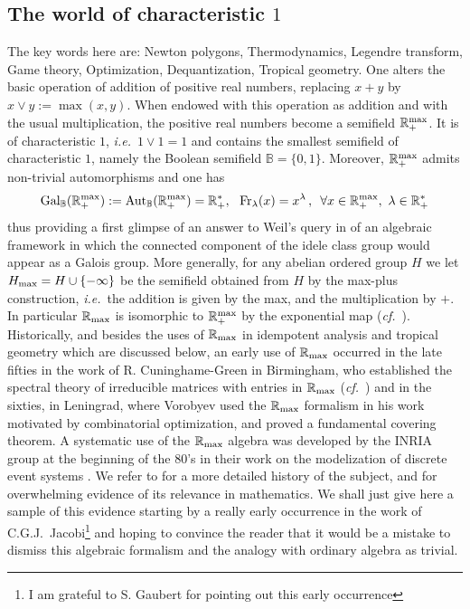 \documentclass[12pt]{article}
\def\qqq{\,,\quad~\forall}
\def\Aut{{\rm Aut}}
\def\B{{\mathbb B}}
\def\R{{\mathbb R}}
\def\qqq{\,,\,~\forall}
\newcommand{\ie}{{\it i.e.\/}\ }
\newcommand{\cf}{{\it cf.}}
\newcommand{\cff}{{\it cf.}~}
\def\rma{\R_{\rm max}}
\def\rmax{\R_+^{\rm max}}
\def\fr{{\rm Fr}}
\begin{document}
\subsection{The world of characteristic $1$}\label{sectchar1}
The key words here are: Newton polygons, Thermodynamics, Legendre transform, Game theory, Optimization, Dequantization, Tropical geometry. One alters the basic operation of addition of positive real numbers, replacing $x+y$ by  $x\vee y:=\max(x,y)$. When endowed with this operation as addition and with the usual multiplication, the positive real numbers become a semifield $\rmax$. It is of characteristic $1$, \ie $1\vee 1=1$ and contains the smallest semifield of characteristic $1$, namely the Boolean semifield $\B=\{0,1\}$. Moreover, $\rmax$ admits non-trivial automorphisms and one has 
$$
{\rm Gal}_\B(\rmax):=\Aut_\B(\rmax)=\R_+^*, \ \ \fr_\lambda(x)=x^\lambda \qqq x\in \rmax, \ \lambda \in \R_+^*
$$
thus providing a first glimpse of an answer to Weil's query in \cite{Weilcdc} of an algebraic framework in which the connected component of the idele class group would appear as a Galois group. More generally, for any abelian ordered group $H$ we let $H_{\rm max}=H\cup \{-\infty\}$ be the semifield obtained from $H$ by the max-plus construction, \ie the addition is given by the max, and the multiplication by $+$. In particular $\R_{\rm max}$ is isomorphic to $\rmax$ by the exponential map (\cf~\cite{Gaubert}). Historically, and besides the uses of $\rma$ in idempotent analysis and tropical geometry which are discussed below, an early use of $\rma$ occurred in the late fifties in the work of R. Cuninghame-Green in Birmingham, who established the spectral theory of irreducible matrices with entries in $\rma$ (\cff\cite{Cunni}) and in the sixties, in Leningrad, where Vorobyev used the $\rma$ formalism in his work motivated by combinatorial optimization, and proved a fundamental covering theorem. A systematic use of the $\rma$ algebra was developed by the  INRIA group at the beginning of the 80's  in their work on the modelization of discrete event systems \cite{Gaubert2}. We refer to \cite{Gaubert, Gaubert1} for a more detailed history of the subject, and for overwhelming evidence of its relevance in mathematics. We shall just give here a sample of this evidence starting by a really early occurrence in the work of C.G.J.~Jacobi\footnote{I am grateful to S. Gaubert for pointing out this early occurrence} and hoping to convince the reader that it would be a mistake  to dismiss this algebraic formalism and the analogy with ordinary algebra as trivial. 
\end{document}
